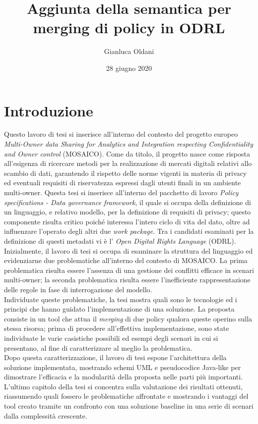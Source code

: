 \documentclass[12pt,a4paper,twoside]{book}
\title{Aggiunta della semantica per merging di policy in ODRL }
\date{28 giugno 2020}
\author{Gianluca Oldani}
\begin{document}
\maketitle
\tableofcontents
\chapter{Introduzione}
Questo lavoro di tesi si inserisce all'interno del contesto del progetto europeo \textit{Multi-Owner data Sharing for Analytics and Integration
respecting Confidentiality and Owner control} (MOSAICO). Come da titolo, il progetto nasce come risposta all'esigenza di ricercare metodi per la realizzazione di mercati digitali relativi allo scambio di dati, garantendo il rispetto delle norme vigenti in materia di privacy ed eventuali requisiti di riservatezza espressi dagli utenti finali in un ambiente multi-owner. Questa tesi si inserisce all'interno del pacchetto di lavoro \textit{Policy specifications - Data governance framework}, il quale si occupa della definizione di un linguaggio, e relativo modello, per la definizione di requisiti di privacy; questo componente risulta critico poiché interessa l'intero ciclo di vita del dato, oltre ad influenzare l'operato degli altri due \textit{work package}. Tra i candidati esaminati per la definizione di questi metadati vi è l' \textit{Open Digital Rights Language} (ODRL). Inizialmente, il lavoro di tesi si occupa di esaminare la struttura del linguaggio ed evidenziarne due problematiche all'interno del contesto di MOSAICO. La prima problematica risulta essere l'assenza di una gestione dei conflitti efficace in scenari multi-owner; la seconda problematica risulta essere l'inefficiente rappresentazione delle regole in fase di interrogazione del modello.\\
Individuate queste problematiche, la tesi mostra quali sono le tecnologie ed i principi che hanno guidato l'implementazione di una soluzione. La proposta consiste in un tool che attua il \textit{merging} di due policy qualora queste operino sulla stessa risorsa; prima di procedere all'effettiva implementazione, sono state individuate le varie casistiche possibili ed esempi degli scenari in cui si presentano, al fine di caratterizzare al meglio la problematica.\\Dopo questa caratterizzazione, il lavoro di tesi espone l'architettura della soluzione implementata, mostrando schemi UML e pseudocodice Java-like per dimostrare l'efficacia e la modularità della proposta nelle parti più importanti.\\
L'ultimo capitolo della tesi si concentra sulla valutazione dei risultati ottenuti, riassumendo quali fossero le problematiche affrontate e mostrando i vantaggi del tool creato tramite un confronto con una soluzione baseline in una serie di scenari dalla complessità crescente.
\end{document}
